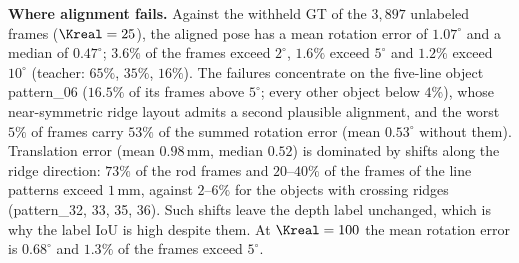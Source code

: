 \noindent\textbf{Where alignment fails.} Against the withheld GT of the $3{,}897$ unlabeled frames ($\Kreal=25$), the aligned pose has a mean rotation error of $1.07^\circ$ and a median of $0.47^\circ$; $3.6\%$ of the frames exceed $2^\circ$, $1.6\%$ exceed $5^\circ$ and $1.2\%$ exceed $10^\circ$ (teacher: $65\%$, $35\%$, $16\%$). The failures concentrate on the five-line object pattern\_06 ($16.5\%$ of its frames above $5^\circ$; every other object below $4\%$), whose near-symmetric ridge layout admits a second plausible alignment, and the worst $5\%$ of frames carry $53\%$ of the summed rotation error (mean $0.53^\circ$ without them). Translation error (mean $0.98\,$mm, median $0.52$) is dominated by shifts along the ridge direction: $73\%$ of the rod frames and $20$--$40\%$ of the frames of the line patterns exceed $1\,$mm, against $2$--$6\%$ for the objects with crossing ridges (pattern\_32, 33, 35, 36). Such shifts leave the depth label unchanged, which is why the label IoU is high despite them. At $\Kreal=100$ the mean rotation error is $0.68^\circ$ and $1.3\%$ of the frames exceed $5^\circ$.

